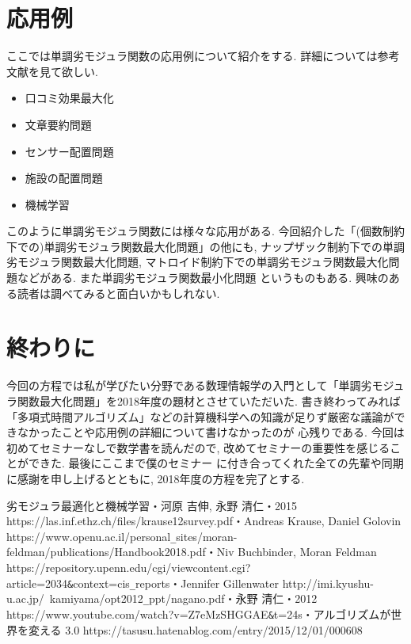 \documentclass[11pt, a4paper, dvipdfmx]{jsarticle}
\theoremstyle{definition}
\begin{document}
\section{応用例}
ここでは単調劣モジュラ関数の応用例について紹介をする. 詳細については参考文献を見て欲しい.
\begin{itemize}
    \item 口コミ効果最大化
    \item 文章要約問題
    \item センサー配置問題
    \item 施設の配置問題
    \item 機械学習
\end{itemize}
このように単調劣モジュラ関数には様々な応用がある. 今回紹介した「(個数制約下での)単調劣モジュラ関数最大化問題」の他にも,
ナップザック制約下での単調劣モジュラ関数最大化問題, マトロイド制約下での単調劣モジュラ関数最大化問題などがある. また単調劣モジュラ関数最小化問題
というものもある. 興味のある読者は調べてみると面白いかもしれない.
\section{終わりに}
今回の方程では私が学びたい分野である数理情報学の入門として「単調劣モジュラ関数最大化問題」を2018年度の題材とさせていただいた. 
書き終わってみれば「多項式時間アルゴリズム」などの計算機科学への知識が足りず厳密な議論ができなかったことや応用例の詳細について書けなかったのが
心残りである. 今回は初めてセミナーなしで数学書を読んだので, 改めてセミナーの重要性を感じることができた. 最後にここまで僕のセミナー
に付き合ってくれた全ての先輩や同期に感謝を申し上げるとともに, 2018年度の方程を完了とする.






\begin{thebibliography}{10}
     劣モジュラ最適化と機械学習・河原 吉伸,  永野 清仁・2015
     https://las.inf.ethz.ch/files/krause12survey.pdf・Andreas Krause, Daniel Golovin
     https://www.openu.ac.il/personal\verb|_|sites/moran-feldman/publications/Handbook2018.pdf・Niv Buchbinder, Moran Feldman
     https://repository.upenn.edu/cgi/viewcontent.cgi?article=2034\verb|&|context=cis\verb|_|reports・Jennifer Gillenwater
     http://imi.kyushu-u.ac.jp/~kamiyama/opt2012\verb|_|ppt/nagano.pdf・永野 清仁・2012
     https://www.youtube.com/watch?v=Z7eMzSHGGAE\verb|&|t=24s・アルゴリズムが世界を変える 3.0
     https://tasusu.hatenablog.com/entry/2015/12/01/000608
  \end{thebibliography}
\end{document}
